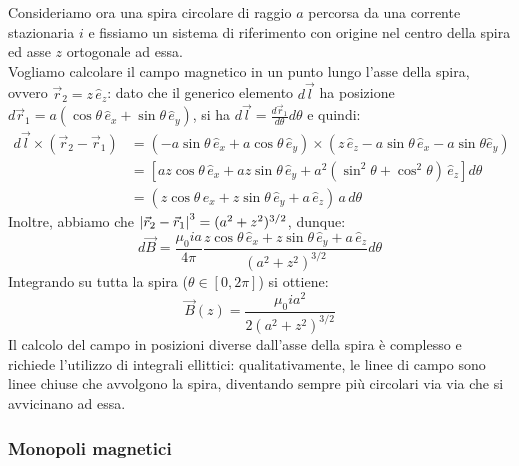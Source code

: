 Consideriamo ora una spira circolare di raggio $ a $ percorsa da una corrente stazionaria $ i $ e fissiamo un sistema di riferimento con origine nel centro della spira ed asse $ z $ ortogonale ad essa. \\ 
%
Vogliamo calcolare il campo magnetico in un punto lungo l'asse della spira, ovvero $ \vec{r}_2 = z \, \hat{e}_z $: dato che il generico elemento $ d\vec{l} $ ha posizione $ d\vec{r}_1 = a (\cos{\theta} \, \hat{e}_x + \sin{\theta} \, \hat{e}_y) $, si ha $ d\vec{l} = \frac{d\vec{r}_1}{d\theta}d\theta $ e quindi:
\begin{equation}
	\begin{split}
		d\vec{l} \times (\vec{r}_2 - \vec{r}_1) &= (-a \sin{\theta} \, \hat{e}_x + a \cos{\theta} \, \hat{e}_y) \times (z \, \hat{e}_z - a \sin{\theta} \, \hat{e}_x - a \sin{\theta} \hat{e}_y) \\ 
							&= \left[ az \cos{\theta} \, \hat{e}_x + az \sin{\theta} \, \hat{e}_y + a^2 (\sin^2{\theta} + \cos^2{\theta}) \, \hat{e}_z \right] d\theta \\ 
							&= (z \cos{\theta} \, \hat{e}_x + z \sin{\theta} \, \hat{e}_y + a \, \hat{e}_z) \, a \, d\theta
	\end{split}
	\label{eq:}
\end{equation}
Inoltre, abbiamo che $ \left\lvert\vec{r}_2 - \vec{r}_1\right\rvert^3 = (a^2 + z^2)^{3/2} $, dunque:
\begin{equation}
	d\vec{B} = \displaystyle\frac{\mu_0 i a}{4\pi} \displaystyle\frac{z \cos{\theta} \, \hat{e}_x + z \sin{\theta} \, \hat{e}_y + a \, \hat{e}_z}{(a^2 + z^2)^{3/2}} d\theta
	\label{eq:}
\end{equation}
Integrando su tutta la spira ($ \theta \in [0, 2\pi] $) si ottiene:
\begin{equation}
	\vec{B}(z) = \displaystyle\frac{\mu_0 i a^2}{2(a^2 + z^2)^{3/2}}
	\label{eq:mag-spir}
\end{equation}
Il calcolo del campo in posizioni diverse dall'asse della spira è complesso e richiede l'utilizzo di integrali ellittici: qualitativamente, le linee di campo sono linee chiuse che avvolgono la spira, diventando sempre più circolari via via che si avvicinano ad essa.

\subsubsection{Monopoli magnetici}

